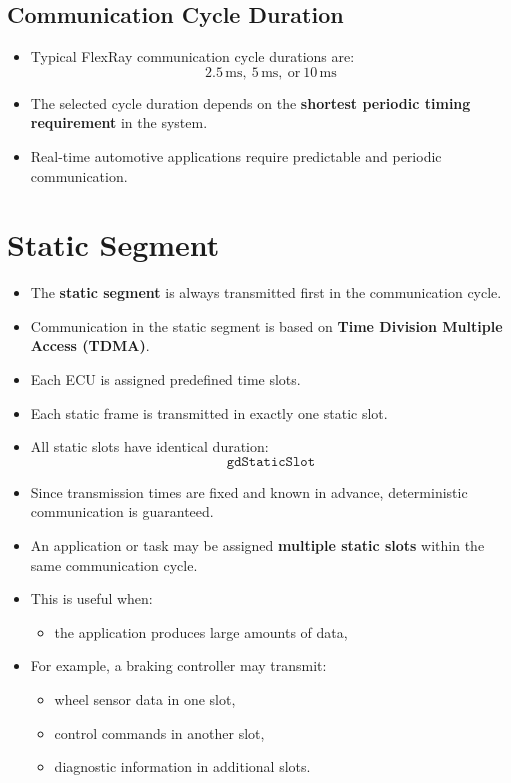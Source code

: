 \subsection*{Communication Cycle Duration}

\begin{itemize}
    \item Typical FlexRay communication cycle durations are:
    \[
    2.5\,\text{ms},\ 5\,\text{ms},\ \text{or}\ 10\,\text{ms}
    \]
    
    \item The selected cycle duration depends on the
    \textbf{shortest periodic timing requirement} in the system.
    
    \item Real-time automotive applications require predictable and periodic communication.
\end{itemize}

\section{Static Segment}

\begin{itemize}
    \item The \textbf{static segment} is always transmitted first in the communication cycle.
    
    \item Communication in the static segment is based on
    \textbf{Time Division Multiple Access (TDMA)}.
    
    \item Each ECU is assigned predefined time slots.
    
    \item Each static frame is transmitted in exactly one static slot.
    
    \item All static slots have identical duration:
    \[
    \texttt{gdStaticSlot}
    \]
    
    \item Since transmission times are fixed and known in advance,
    deterministic communication is guaranteed.
    
    \item An application or task may be assigned
    \textbf{multiple static slots} within the same communication cycle.
    
    \item This is useful when:
    \begin{itemize}
        \item the application produces large amounts of data,
    \end{itemize}
    \item For example, a braking controller may transmit:
    \begin{itemize}
        \item wheel sensor data in one slot,
        \item control commands in another slot,
        \item diagnostic information in additional slots.
    \end{itemize}
\end{itemize}


